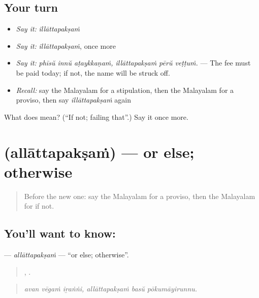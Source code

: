 \subsection*{Your turn}
\begin{itemize}
\raggedright
  \item \emph{Say it:} \emph{illāttapakṣaṁ}
  \item \emph{Say it:} \emph{illāttapakṣaṁ}, once more
  \item \emph{Say it:} \emph{phīsŭ innŭ aṭaykkaṇaṁ, illāttapakṣaṁ pērŭ veṭṭuṁ.} — The fee must be paid today; if not, the name will be struck off.
  \item \emph{Recall:} say the Malayalam for a stipulation, then the Malayalam for a proviso, then say \emph{illāttapakṣaṁ} again
\end{itemize}

\begin{tcolorbox}[breakable,colback=teal!4,colframe=teal!35!black,title={Before you move on}]
What does  mean? (\textquotedblleft{}If not; failing that\textquotedblright{}.) Say it once more.
\end{tcolorbox}
\section[\texorpdfstring{\ml{അല്ലാത്തപക്ഷം} (allāttapakṣaṁ)}{അല്ലാത്തപക്ഷം (allāttapakṣaṁ)}]{ (allāttapakṣaṁ) — or else; otherwise}

\label{lesson:ML-C440-allattapaksam}



\begin{quote}
Before the new one: say the Malayalam for a proviso, then the Malayalam for if not.
\end{quote}

\subsection*{You'll want to know: }
\textbf{} — \emph{allāttapakṣaṁ} — \textquotedblleft{}or else; otherwise\textquotedblright{}.

\begin{quote}
  ,   .
\end{quote}

\begin{quote}
\emph{avan vēgaṁ iṟaṅṅi, allāttapakṣaṁ basŭ pōkumāyirunnu.}
\end{quote}

